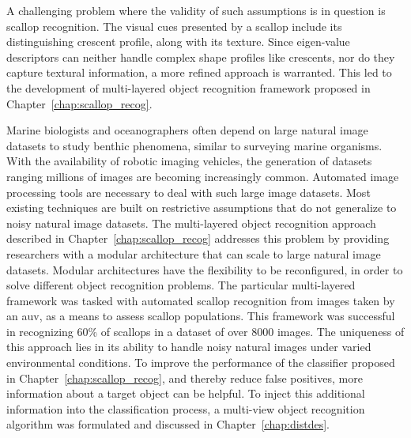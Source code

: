 A challenging problem where the validity of such assumptions is in question is scallop recognition.
The visual cues presented by a scallop include its distinguishing crescent profile, along with its texture.
Since eigen-value descriptors can neither handle complex shape profiles like crescents, nor do they capture textural information,
a more refined approach is warranted.
This led to the development of multi-layered object recognition framework proposed in Chapter~\ref{chap:scallop_recog}.

Marine biologists and oceanographers often depend on large natural image datasets to study benthic phenomena, similar to surveying marine organisms. With the availability of robotic imaging vehicles, the generation of datasets ranging millions of images are becoming increasingly common. Automated image processing tools are necessary to deal with such large image datasets. Most existing techniques are built on restrictive assumptions that do not generalize to noisy natural image datasets. The multi-layered object recognition approach described in Chapter~\ref{chap:scallop_recog} addresses this problem by providing researchers with a modular architecture that can scale to large natural image datasets. Modular architectures have the flexibility to be reconfigured, in order to solve different object recognition problems.
The particular multi-layered framework was tasked with automated scallop recognition from images taken by an \gls{auv}, as a means to assess scallop populations. 
This framework was successful in recognizing 60\% of scallops in a dataset of over 8000 images.
The uniqueness of this approach lies in its ability to handle noisy natural images under varied environmental conditions.
To improve the performance of the classifier proposed in Chapter~\ref{chap:scallop_recog}, and thereby reduce false positives, more information about a target object can be helpful.
To inject this additional information into the classification process, a multi-view object recognition algorithm was formulated and discussed in Chapter~\ref{chap:distdes}.

